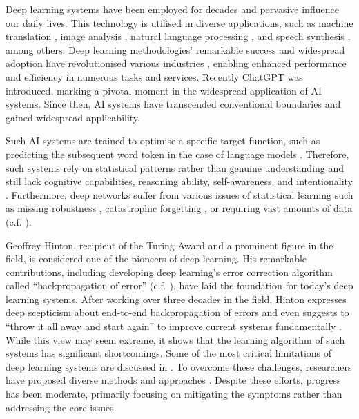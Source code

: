 Deep learning systems have been employed for decades \cite{ivakhnenko_cybernetic_1965} and pervasive influence our daily lives. This technology is utilised in diverse applications, such as machine translation \cite{dabre_survey_2021}, image analysis \cite{bhatt_cnn_2021}, natural language processing \cite{otter_survey_2021}, and speech synthesis \cite{ning_review_2019}, among others. Deep learning methodologies' remarkable success and widespread adoption have revolutionised various industries , enabling enhanced performance and efficiency in numerous tasks and services.
Recently ChatGPT  was introduced, marking a pivotal moment in the widespread application of AI systems.
Since then, AI systems have transcended conventional boundaries and gained widespread applicability.

Such AI systems are trained to optimise a specific target function, such as predicting the subsequent word token in the case of language models .
Therefore, such systems rely on statistical patterns rather than genuine understanding and still lack cognitive capabilities, reasoning ability, self-awareness, and intentionality .
Furthermore, deep networks suffer from various issues of statistical learning such as missing robustness , catastrophic forgetting , or requiring vast amounts of data  (c.f. ).

Geoffrey Hinton, recipient of the Turing Award and a prominent figure in the field, is considered one of the pioneers of deep learning.
His remarkable contributions, including developing deep learning's error correction algorithm called ``backpropagation of error'' (c.f. ), have laid the foundation for today's deep learning systems.
After working over three decades in the field, Hinton expresses deep scepticism about end-to-end backpropagation of errors and even suggests to ``throw it all away and start again'' to improve current systems fundamentally .
While this view may seem extreme, it shows that the learning algorithm of such systems has significant shortcomings.
Some of the most critical limitations of deep learning systems are discussed in .
To overcome these challenges, researchers have proposed diverse methods and approaches \cite{long_survey_2022, sager_unsupervised_2022, yarats_improving_2021}. Despite these efforts, progress has been moderate, primarily focusing on mitigating the symptoms rather than addressing the core issues.

